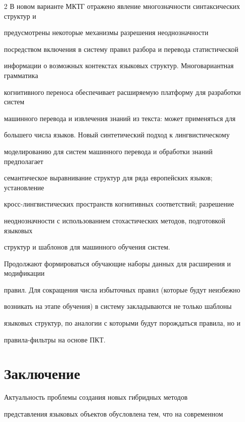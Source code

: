 \begin{multicols}{2}
В новом варианте МКТГ отражено явление многозначности синтаксических структур и 


предусмот\-ре\-ны некоторые механизмы разрешения не\-од\-нознач\-но\-сти 


посредством включения в систему правил разбора и перевода статистической 


информации о возможных контекстах языковых структур. Многовариантная грамматика 


когнитивного переноса обеспечивает расширяемую платформу для разработки систем 


машинного перевода и извлечения знаний из текста: может применяться для 


большего числа языков. Новый синтетический подход к лингвистическому 


моделированию для систем машинного перевода и обработки знаний предполагает 


семантическое выравнивание структур для ряда европейских языков; установление 


кросс-лингвистических пространств когнитивных соответствий;  разрешение 


неоднозначности с использованием стохастических методов, подготовкой языковых 


структур и шаблонов для машинного обучения систем.





Продолжают формироваться обучающие наборы данных для расширения и модификации 


правил. Для сокращения числа избыточных правил (которые будут неизбежно 


возникать на этапе обуче\-ния) в систему закладываются не только шаблоны 


языковых структур, по аналогии с которыми будут порождаться правила, но и 


правила-фильтры на основе ПКТ.





\section{Заключение}





Актуальность проблемы создания новых гиб\-рид\-ных методов


представления языковых объектов обусловлена тем, что на современном



\end{multicols}
